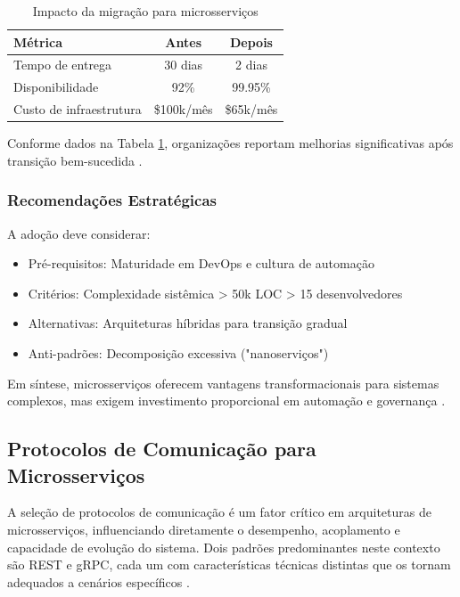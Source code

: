 \begin{table}[h]
\centering
\caption{Impacto da migração para microsserviços}
\begin{tabular}{|l|c|c|}
\hline
Métrica & Antes & Depois \\
\hline
Tempo de entrega & 30 dias & 2 dias \\
Disponibilidade & 92\% & 99.95\% \\
Custo de infraestrutura & \$100k/mês & \$65k/mês \\
\hline
\end{tabular}
\label{tab:impacto}
\end{table}

Conforme dados na Tabela \ref{tab:impacto}, organizações reportam melhorias significativas após transição bem-sucedida \cite{farhan2023performance, shekhar2023microservices}.

\subsubsection{Recomendações Estratégicas}
A adoção deve considerar:

\begin{itemize}
    \item Pré-requisitos: Maturidade em DevOps e cultura de automação
    \item Critérios: Complexidade sistêmica > 50k LOC > 15 desenvolvedores
    \item Alternativas: Arquiteturas híbridas para transição gradual
    \item Anti-padrões: Decomposição excessiva ("nanoserviços")
\end{itemize}

Em síntese, microsserviços oferecem vantagens transformacionais para sistemas complexos, mas exigem investimento proporcional em automação e governança \cite{nizami2020comparison, observability2023}.

\subsection{Protocolos de Comunicação para Microsserviços}
A seleção de protocolos de comunicação é um fator crítico em arquiteturas de microsserviços, influenciando diretamente o desempenho, acoplamento e capacidade de evolução do sistema. Dois padrões predominantes neste contexto são \gls{REST} e \gls{gRPC}, cada um com características técnicas distintas que os tornam adequados a cenários específicos \cite{niswar2023performance}.


